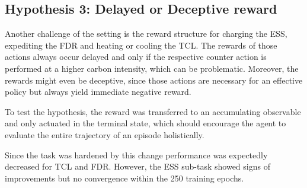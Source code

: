 \subsection{Hypothesis 3: Delayed or Deceptive reward}
Another challenge of the setting is the reward structure for charging the ESS, expediting the FDR and heating or cooling the TCL. The rewards of those actions always occur delayed and only if the respective counter action is performed at a higher carbon intensity, which can be problematic. Moreover, the rewards might even be deceptive, since those actions are necessary for an effective policy but always yield immediate negative reward.
\par
To test the hypothesis, the reward was transferred to an accumulating observable and only actuated in the terminal state, which should encourage the agent to evaluate the entire trajectory of an episode holistically.
\par 
Since the task was hardened by this change performance was expectedly decreased for TCL and FDR. However, the ESS sub-task showed signs of improvements but no convergence within the 250 training epochs.